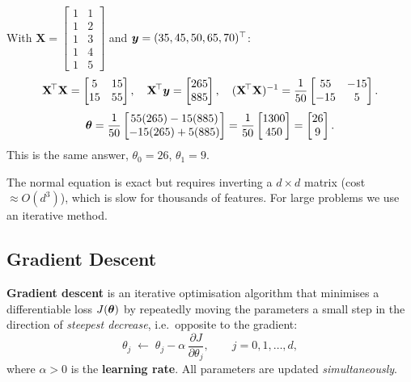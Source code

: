 \begin{example}
With $\mathbf X=\begin{bmatrix}1&1\\1&2\\1&3\\1&4\\1&5\end{bmatrix}$ and $\boldsymbol{y}=(35,45,50,65,70)^{\top}$:
\[
\mathbf X^{\!\top}\mathbf X=\begin{bmatrix}5&15\\15&55\end{bmatrix},\quad
\mathbf X^{\!\top}\boldsymbol{y}=\begin{bmatrix}265\\885\end{bmatrix},\quad
(\mathbf X^{\!\top}\mathbf X)^{-1}=\frac1{50}\begin{bmatrix}55&-15\\-15&5\end{bmatrix}.
\]
\[
\boldsymbol{\theta}=\frac1{50}\begin{bmatrix}55(265)-15(885)\\-15(265)+5(885)\end{bmatrix}
=\frac1{50}\begin{bmatrix}1300\\450\end{bmatrix}=\begin{bmatrix}26\\9\end{bmatrix}.
\]
This is the same answer, $\theta_0=26$, $\theta_1=9$.
\end{example}

The normal equation is exact but requires inverting a $d\times d$ matrix (cost $\approx O(d^3)$), which is slow for thousands of features. For large problems we use an iterative method.

\subsection{Gradient Descent}

\begin{definition}
\textbf{Gradient descent} is an iterative optimisation algorithm that minimises a differentiable loss $J(\boldsymbol{\theta})$ by repeatedly moving the parameters a small step in the direction of \emph{steepest decrease}, i.e.\ opposite to the gradient:
\[
  \theta_j\;\leftarrow\;\theta_j-\alpha\,\frac{\partial J}{\partial\theta_j},\qquad j=0,1,\dots,d,
\]
where $\alpha>0$ is the \textbf{learning rate}. All parameters are updated \emph{simultaneously}.
\end{definition}

